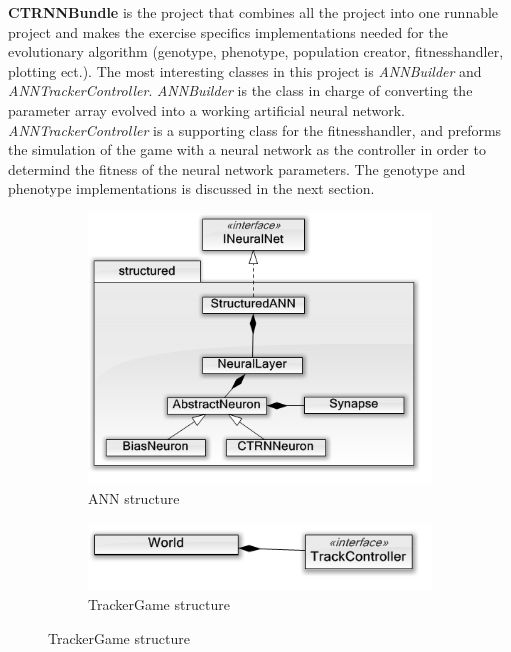 \documentclass[12pt]{article}
\begin{document}
		\textbf{CTRNNBundle} is the project that combines all the project into one runnable project and makes the exercise specifics implementations needed for the evolutionary algorithm (genotype, phenotype, population creator, fitnesshandler, plotting ect.). The most interesting classes in this project is \textit{ANNBuilder} and \textit{ANNTrackerController}. \textit{ANNBuilder} is the class in charge of converting the parameter array evolved into a working artificial neural network. \textit{ANNTrackerController} is a supporting class for the fitnesshandler, and preforms the simulation of the game with a neural network as the controller in order to determind the fitness of the  neural network parameters. The genotype and phenotype implementations is discussed in the next section. 
		
	\begin{figure}
		\centering
		\begin{subfigure}{.3\textwidth}
			\centering
			\includegraphics[width=\linewidth]{./../images/ANN.png}
			\caption{ANN structure}
			\label{fig:annstruct}
		\end{subfigure}
		\begin{subfigure}{.3\textwidth}
			\centering
			\includegraphics[width=\linewidth]{./../images/TrackerGame.png}
			\caption{TrackerGame structure}

\end{subfigure}
\end{figure}
\end{document}

